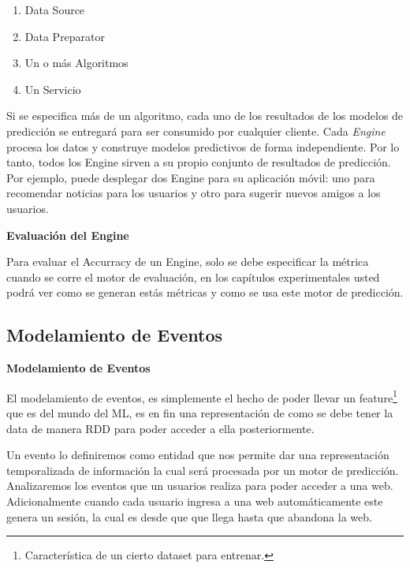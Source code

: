   \begin{enumerate}
    \item Data Source
    \item Data Preparator
    \item Un o más Algoritmos
    \item Un Servicio
  \end{enumerate}

  Si se especifica más de un algoritmo, cada uno de los resultados de los modelos de predicción se entregará para ser consumido por cualquier cliente.
  Cada \emph{Engine} procesa los datos y construye modelos predictivos de forma independiente. Por lo tanto, todos los Engine sirven a su propio conjunto de resultados de predicción. Por ejemplo, puede desplegar dos Engine para su aplicación móvil: uno para recomendar noticias para los usuarios y otro para sugerir nuevos amigos a los usuarios.


\vspace{1cm}
\textbf{Evaluación del Engine }

  Para evaluar el Accurracy de un Engine, solo se debe especificar la métrica cuando se corre el motor de evaluación, en los capítulos experimentales usted podrá ver como se generan estás métricas y como se usa este motor de predicción.











\subsection{Modelamiento de Eventos}



\textbf{Modelamiento de Eventos}

  El modelamiento de eventos, es simplemente el hecho de poder llevar un feature\footnote{Característica de un cierto dataset para entrenar.}   que es del mundo del ML, es en fin una representación de como se debe tener la data de manera RDD para poder acceder a ella posteriormente. 

  Un evento lo definiremos como entidad que nos permite dar una representación temporalizada de información la cual será procesada por un motor de predicción. Analizaremos los eventos que un usuarios realiza para poder acceder a una web. Adicionalmente cuando cada usuario ingresa a una web automáticamente este genera un sesión, la cual es desde que que llega hasta que abandona la web.

